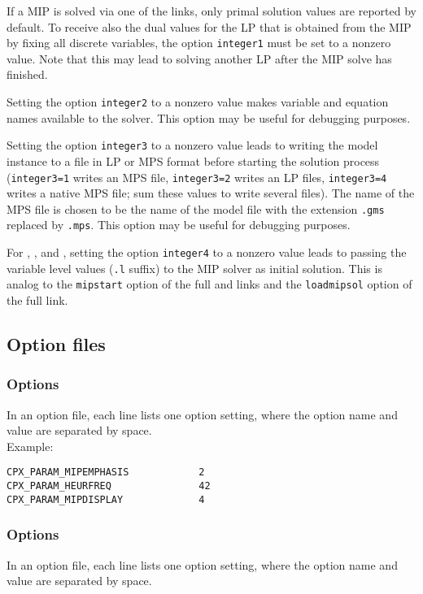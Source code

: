 If a MIP is solved via one of the \OSI links, only primal solution values are reported by default.
To receive also the dual values for the LP that is obtained from the MIP by fixing all discrete variables, the \GAMS option \texttt{integer1} must be set to a nonzero value. Note that this may lead to solving another LP after the MIP solve has finished.

Setting the \GAMS option \texttt{integer2} to a nonzero value makes variable and equation names available to the solver.
This option may be useful for debugging purposes.

Setting the \GAMS option \texttt{integer3} to a nonzero value leads to writing the model instance to a file in LP or MPS format before starting the solution process (\texttt{integer3=1} writes an MPS file, \texttt{integer3=2} writes an LP files, \texttt{integer3=4} writes a native MPS file; sum these values to write several files).
The name of the MPS file is chosen to be the name of the \GAMS model file with the extension \texttt{.gms} replaced by \texttt{.mps}.
This option may be useful for debugging purposes.

For \OSICPLEX, \OSIGUROBI, and \OSIXPRESS, setting the \GAMS option \texttt{integer4} to a nonzero value leads to passing the variable level values (\texttt{.l} suffix) to the MIP solver as initial solution. This is analog to the \texttt{mipstart} option of the full \CPLEX and \GUROBI links and the \texttt{loadmipsol} option of the full \XPRESS link.

\subsection{Option files}
\label{sub:osioptions}

\subsubsection{\OSICPLEX Options}
In an \OSICPLEX option file, each line lists one option setting, where the option name and value are separated by space.\\
Example:
\begin{verbatim}
CPX_PARAM_MIPEMPHASIS            2
CPX_PARAM_HEURFREQ               42
CPX_PARAM_MIPDISPLAY             4
\end{verbatim}

\subsubsection{\OSIGUROBI Options}
In an \OSIGUROBI option file, each line lists one option setting, where the option name and value are separated by space.

